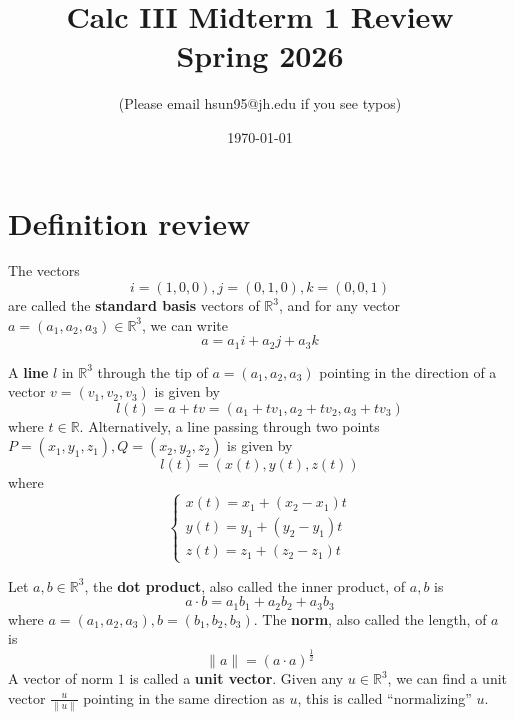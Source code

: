 \documentclass[openany]{book}
\title{Calc III Midterm 1 Review
\\ 
\vspace{0.4cm}
\large Spring 2026}
\author{(Please email hsun95@jh.edu if you see typos)}
\date{\today}
\newcommand{\R}{\mathbb{R}}
\begin{document}
\maketitle

\tableofcontents
\newpage


\chapter{Definition review}



\begin{defn}[standard basis in $\R^3$]
    The vectors 
    \begin{equation*}
        i=(1,0,0), j=(0,1,0), k=(0,0,1)
    \end{equation*}
    are called the \textbf{standard basis} vectors of $\R^3$, and for any vector $a=(a_1,a_2,a_3)\in\R^3$, we can write 
    \begin{equation*}
        a=a_1i+a_2j+a_3k
    \end{equation*}
\end{defn}




\begin{defn}\label{line}
    A \textbf{line} $l$ in $\R^3$ through the tip of $a=(a_1,a_2,a_3)$ pointing in the direction of a vector $v=(v_1,v_2,v_3)$ is given by 
    \begin{equation*}
        l(t)=a+tv=(a_1+tv_1, a_2+tv_2, a_3+tv_3)
    \end{equation*}
    where $t\in\R$. Alternatively, a line passing through two points $P=(x_1,y_1,z_1), Q=(x_2,y_2,z_2)$ is given by 
    \begin{equation*}
        l(t)=(x(t), y(t), z(t))
    \end{equation*}
    where 
    \begin{equation*}
        \begin{cases}
            x(t)=x_1+(x_2-x_1)t\\
            y(t)=y_1+(y_2-y_1)t\\
            z(t)=z_1+(z_2-z_1)t
        \end{cases}
    \end{equation*}
\end{defn}



\begin{defn}
    Let $a,b\in\R^3$, the \textbf{dot product}, also called the inner product, of $a,b$ is 
    \begin{equation*}
        a\cdot b=a_1b_1+a_2b_2+a_3b_3
    \end{equation*}
    where $a=(a_1,a_2,a_3), b=(b_1,b_2,b_3)$. The \textbf{norm}, also called the length, of $a$ is 
    \begin{equation*}
        \|a\|=(a\cdot a)^\frac{1}{2}
    \end{equation*}
    A vector of norm $1$ is called a \textbf{unit vector}. Given any $u\in\R^3$, we can find a unit vector $\frac{u}{\|u\|}$ pointing in the same direction as $u$, this is called ``normalizing'' $u$.
\end{defn}
\end{document}
